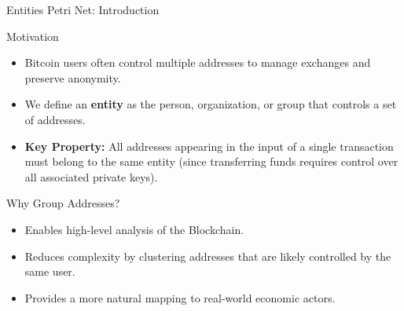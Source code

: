 \documentclass{beamer}
\begin{document}
\begin{frame}{Entities Petri Net: Introduction}
    \footnotesize
    \begin{block}{Motivation}
        \begin{itemize}
            \item Bitcoin users often control multiple addresses to manage exchanges and preserve anonymity.
            \item We define an \textbf{entity} as the person, organization, or group that controls a set of addresses.
            \item \textbf{Key Property:} All addresses appearing in the input of a single transaction must belong to the same entity
                  (since transferring funds requires control over all associated private keys).
        \end{itemize}
    \end{block}

    \begin{block}{Why Group Addresses?}
        \begin{itemize}
            \item Enables high-level analysis of the Blockchain.
            \item Reduces complexity by clustering addresses that are likely controlled by the same user.
            \item Provides a more natural mapping to real-world economic actors.
        \end{itemize}
    \end{block}
\end{frame}
\end{document}
